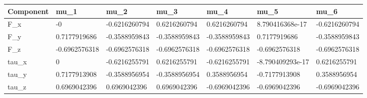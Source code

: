 \begin{tabular}{@{}lllllll@{}}
\toprule
Component & mu\_1 & mu\_2 & mu\_3 & mu\_4 & mu\_5 & mu\_6 \\
\midrule
F\_x & -0 & -0.6216260794 & 0.6216260794 & 0.6216260794 & 8.790416368e-17 & -0.6216260794 \\
F\_y & 0.7177919686 & -0.3588959843 & -0.3588959843 & -0.3588959843 & 0.7177919686 & -0.3588959843 \\
F\_z & -0.6962576318 & -0.6962576318 & -0.6962576318 & -0.6962576318 & -0.6962576318 & -0.6962576318 \\
tau\_x & 0 & -0.6216255791 & 0.6216255791 & -0.6216255791 & -8.790409293e-17 & 0.6216255791 \\
tau\_y & 0.7177913908 & -0.3588956954 & -0.3588956954 & 0.3588956954 & -0.7177913908 & 0.3588956954 \\
tau\_z & 0.6969042396 & 0.6969042396 & 0.6969042396 & -0.6969042396 & -0.6969042396 & -0.6969042396 \\
\bottomrule
\end{tabular}
